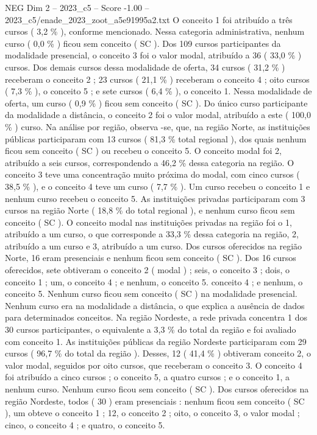 \begin{textsample}{NEG Dim 2 – 2023\_c5 – Score -1.00 – 2023\_c5/enade\_2023\_zoot\_a5e91995a2.txt}
O conceito 1 foi atribuído a três cursos ( 3,2 \% ), conforme mencionado.
Nessa categoria administrativa, nenhum curso ( 0,0 \% ) ficou sem conceito ( SC ).
Dos 109 cursos participantes da modalidade presencial, o conceito 3 foi o valor modal, atribuído a 36 ( 33,0 \% ) cursos.
Dos demais cursos dessa modalidade de oferta, 34 cursos ( 31,2 \% ) receberam o conceito 2 ; 23 cursos ( 21,1 \% ) receberam o conceito 4 ; oito cursos ( 7,3 \% ), o conceito 5 ; e sete cursos ( 6,4 \% ), o conceito 1.
Nessa modalidade de oferta, um curso ( 0,9 \% ) ficou sem conceito ( SC ).
Do único curso participante da modalidade a distância, o conceito 2 foi o valor modal, atribuído a este ( 100,0 \% ) curso.
Na análise por região, observa -se, que, na região Norte, as instituições públicas participaram com 13 cursos ( 81,3 \% total regional ), dos quais nenhum ficou sem conceito ( SC ) ou recebeu o conceito 5.
O conceito modal foi 2, atribuído a seis cursos, correspondendo a 46,2 \% dessa categoria na região.
O conceito 3 teve uma concentração muito próxima do modal, com cinco cursos ( 38,5 \% ), e o conceito 4 teve um curso ( 7,7 \% ).
Um curso recebeu o conceito 1 e nenhum curso recebeu o conceito 5.
As instituições privadas participaram com 3 cursos na região Norte ( 18,8 \% do total regional ), e nenhum curso ficou sem conceito ( SC ).
O conceito modal nas instituições privadas na região foi o 1, atribuído a um curso, o que corresponde a 33,3 \% dessa categoria na região, 2, atribuído a um curso e 3, atribuído a um curso.
Dos cursos oferecidos na região Norte, 16 eram presenciais e nenhum ficou sem conceito ( SC ).
Dos 16 cursos oferecidos, sete obtiveram o conceito 2 ( modal ) ; seis, o conceito 3 ; dois, o conceito 1 ; um, o conceito 4 ; e nenhum, o conceito 5. conceito 4 ; e nenhum, o conceito 5.
Nenhum curso ficou sem conceito ( SC ) na modalidade presencial.
Nenhum curso era na modalidade a distância, o que explica a ausência de dados para determinados conceitos.
Na região Nordeste, a rede privada concentra 1 dos 30 cursos participantes, o equivalente a 3,3 \% do total da região e foi avaliado com conceito 1.
As instituições públicas da região Nordeste participaram com 29 cursos ( 96,7 \% do total da região ).
Desses, 12 ( 41,4 \% ) obtiveram conceito 2, o valor modal, seguidos por oito cursos, que receberam o conceito 3.
O conceito 4 foi atribuído a cinco cursos ; o conceito 5, a quatro cursos ; e o conceito 1, a nenhum curso.
Nenhum curso ficou sem conceito ( SC ).
Dos cursos oferecidos na região Nordeste, todos ( 30 ) eram presenciais : nenhum ficou sem conceito ( SC ), um obteve o conceito 1 ; 12, o conceito 2 ; oito, o conceito 3, o valor modal ; cinco, o conceito 4 ; e quatro, o conceito 5.

\end{textsample}
